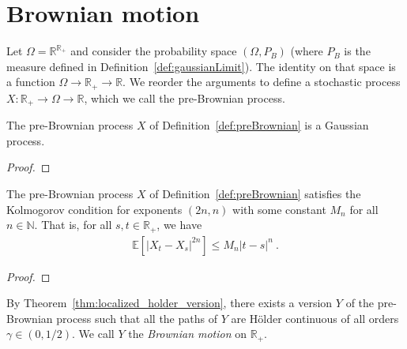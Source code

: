 \chapter{Brownian motion}
\label{chap:brownian}


\begin{definition}\label{def:preBrownian}
Let $\Omega = \mathbb{R}^{\mathbb{R}_+}$ and consider the probability space $(\Omega, P_B)$ (where $P_B$ is the measure defined in Definition~\ref{def:gaussianLimit}).
The identity on that space is a function $\Omega \to \mathbb{R}_+ \to \mathbb{R}$.
We reorder the arguments to define a stochastic process $X : \mathbb{R}_+ \to \Omega \to \mathbb{R}$, which we call the pre-Brownian process.
\end{definition}


\begin{lemma}\label{lem:isGaussianProcess_preBrownian}
  The pre-Brownian process $X$ of Definition~\ref{def:preBrownian} is a Gaussian process.
\end{lemma}

\begin{proof}

\end{proof}


\begin{lemma}\label{lem:isKolmogorovProcess_preBrownian}
  The pre-Brownian process $X$ of Definition~\ref{def:preBrownian} satisfies the Kolmogorov condition for exponents $(2n,n)$ with some constant $M_n$ for all $n \in \mathbb{N}$.
  That is, for all $s, t \in \mathbb{R}_+$, we have
  \begin{align*}
    \mathbb{E} \left[ |X_t - X_s|^{2n} \right] \le M_n |t - s|^n
    \: .
  \end{align*}
\end{lemma}

\begin{proof}

\end{proof}


\begin{definition}\label{def:brownianMotion}
  \notready
By Theorem~\ref{thm:localized_holder_version}, there exists a version $Y$ of the pre-Brownian process such that all the paths of $Y$ are Hölder continuous of all orders $\gamma \in (0, 1/2)$.
We call $Y$ the \emph{Brownian motion} on $\mathbb{R}_+$.
\end{definition}



